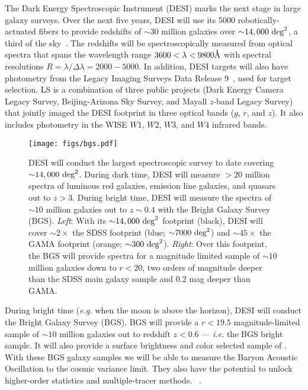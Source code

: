 The Dark Energy Spectroscopic Instrument (DESI) marks the next stage in large
galaxy surveys. 
Over the next five years, DESI will use its 5000 robotically-actuated fibers to
provide redshifts of ${\sim}30$ million galaxies over 
${\sim}14,000~{\rm deg}^2$, a third of the sky~\citep{desicollaboration2016}.
The redshifts will be spectroscopically measured from optical spectra that
spans the wavelength range $3600 < \lambda < 9800\AA$ with spectral resolutions
$R = \lambda/\Delta \lambda = 2000 - 5000$.
In addition, DESI targets will also have photometry from the Legacy Imaging
Surveys Data Release 9~\citep[LS][]{dey2019}, used for target selection. 
LS is a combination of three public projects (Dark Energy Camera Legacy Survey,
Beijing-Arizona Sky Survey, and Mayall $z$-band Legacy Survey) that jointly
imaged the DESI footprint in three optical bands ($g$, $r$, and $z$). 
It also includes photometry in the WISE $W1$, $W2$, $W3$, and $W4$ infrared bands.




\begin{figure}
\begin{center}
\texttt{[image: figs/bgs.pdf]} 
\caption{DESI will conduct the largest spectroscopic survey to 
date covering ${\sim}14,000~{\rm deg}^2$. During dark time, DESI will measure
${>}20$ million spectra of luminous red galaxies, emission line galaxies, and 
quasars out to $z > 3$. During bright time, DESI will measure the spectra of 
${\sim}10$ million galaxies out to $z{\sim}0.4$  with the Bright Galaxy Survey (BGS).
{\em Left}: With its ${\sim}14,000~{\rm deg}^2$ footprint (black), DESI will 
cover ${\sim}2\times$ the SDSS footprint (blue; ${\sim}7000~{\rm deg}^2$) 
and ${\sim}45\times$ the GAMA footprint (orange; ${\sim}300~{\rm deg}^2$). 
{\em Right}: Over this footprint, the BGS will provide spectra for a magnitude 
limited sample of ${\sim}10$ million galaxies down to $r < 20$, two orders of 
magnitude deeper than the SDSS main galaxy sample and $0.2$ mag deeper than GAMA.}
\label{fig:bgs}
\end{center}
\end{figure}

During bright time (\emph{e.g.} when the moon is above the horizon), DESI will
conduct the Bright Galaxy Survey (BGS). 
BGS will provide a $r < 19.5$ magnitude-limited sample of ${\sim}10$ million
galaxies out to redshift $z < 0.6$ --- \emph{i.e.} the BGS bright sample. 
It will also provide a surface brightness and color selected sample of 
. 
With these BGS galaxy samples we will be able to measure the Baryon Acoustic
Oscillation to the cosmic variance limit. 
They also have the potential to unlock higher-order statistics and
multiple-tracer methods. 
~\citep{desicollaboration2016,
desicollaboration2016a}.


